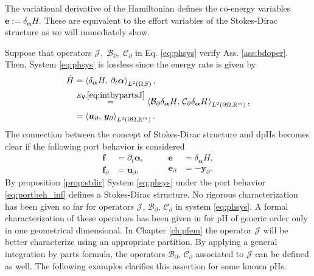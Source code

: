 \begin{remark}
	The variational derivative of the Hamiltonian defines the co-energy variables $\bm{e}:=\delta_{\bm{\alpha}} H$. These are equivalent to the effort variables of the Stokes-Dirac structure as we will immediately show.
\end{remark}

Suppose that operators $\mathcal{J}, \; \mathcal{B}_\partial, \;  \mathcal{C}_\partial$ in Eq. \ref{eq:phsys} verify Ass. \ref{ass:bdoper}. Then, System \eqref{eq:phsys} is lossless since the energy rate is  given by 
\begin{equation}\label{eq:enrate}
\begin{aligned}
\dot{H} &= \inner[L^2(\Omega, \bbF)]{\delta_{\bm{\alpha}} H}{\partial_t \bm{\alpha}}, \\
&\stackrel{Eq. \eqref{eq:intbypartsJ}}{=} \inner[L^2(\partial\Omega, \bbR^m)]{\mathcal{B}_\partial \delta_{\bm{\alpha}} H}{\mathcal{C}_\partial \delta_{\bm{\alpha}} H}, \\
&= \inner[L^2(\partial\Omega, \bbR^m)]{\bm{u}_\partial}{\bm{y}_\partial}. \
\end{aligned}
\end{equation} 
The connection between the concept of Stokes-Dirac structure and dpHs becomes clear if the following port behavior is considered
\begin{equation}\label{eq:portbeh_inf}
\begin{aligned}
\bm{f} &= \partial_t \bm{\alpha}, \\
\bm{f}_\partial &= \bm{u}_\partial, 
\end{aligned} \qquad
\begin{aligned}
\bm{e} &= \delta_{\bm{\alpha}} H, \\
\bm{e}_\partial &= -\bm{y}_\partial. 
\end{aligned}
\end{equation}
By proposition \eqref{prop:stdir} System \eqref{eq:phsys} under the port behavior \eqref{eq:portbeh_inf} defines a Stokes-Dirac structure.  
No rigorous characterization has been given so far for operators $\mathcal{J}, \, \mathcal{B_\partial,\, C_\partial}$ in system \eqref{eq:phsys}. A formal characterization of these operators has been given in \cite{legorrec2005} for pH of generic order only in one geometrical dimensional. In Chapter \ref{ch:pfem} the operator $\mathcal{J}$ will be better characterize using an appropriate partition. By applying a general integration by parts formula, the operators $\mathcal{B_\partial,\, C_\partial}$ associated to $\mathcal{J}$ can be defined as well. The following examples clarifies this assertion for some known pHs.



